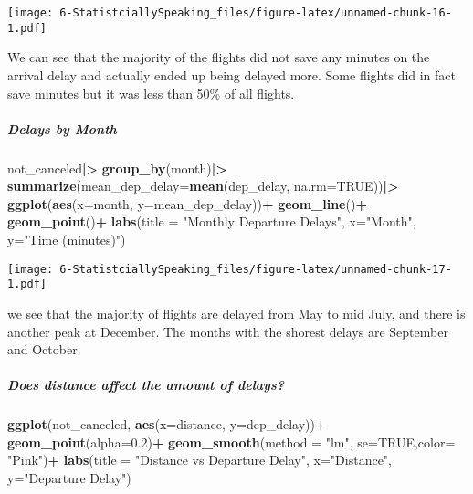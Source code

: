 \documentclass[
]{article}
\newenvironment{Shaded}{\begin{snugshade}}{\end{snugshade}}
\newcommand{\AttributeTok}[1]{\textcolor[rgb]{0.13,0.29,0.53}{#1}}
\newcommand{\ConstantTok}[1]{\textcolor[rgb]{0.56,0.35,0.01}{#1}}
\newcommand{\FloatTok}[1]{\textcolor[rgb]{0.00,0.00,0.81}{#1}}
\newcommand{\FunctionTok}[1]{\textcolor[rgb]{0.13,0.29,0.53}{\textbf{#1}}}
\newcommand{\NormalTok}[1]{#1}
\newcommand{\SpecialCharTok}[1]{\textcolor[rgb]{0.81,0.36,0.00}{\textbf{#1}}}
\newcommand{\StringTok}[1]{\textcolor[rgb]{0.31,0.60,0.02}{#1}}
\begin{document}
\texttt{[image: 6-StatistciallySpeaking\_files/figure-latex/unnamed-chunk-16-1.pdf]}

We can see that the majority of the flights did not save any minutes on
the arrival delay and actually ended up being delayed more. Some flights
did in fact save minutes but it was less than 50\% of all flights.

\subparagraph{Delays by Month}\label{delays-by-month}

\begin{Shaded}
\begin{Highlighting}[]
\NormalTok{not\_canceled}\SpecialCharTok{|\textgreater{}}
  \FunctionTok{group\_by}\NormalTok{(month)}\SpecialCharTok{|\textgreater{}}
  \FunctionTok{summarize}\NormalTok{(}\AttributeTok{mean\_dep\_delay=}\FunctionTok{mean}\NormalTok{(dep\_delay, }\AttributeTok{na.rm=}\ConstantTok{TRUE}\NormalTok{))}\SpecialCharTok{|\textgreater{}}
  \FunctionTok{ggplot}\NormalTok{(}\FunctionTok{aes}\NormalTok{(}\AttributeTok{x=}\NormalTok{month, }\AttributeTok{y=}\NormalTok{mean\_dep\_delay))}\SpecialCharTok{+}
  \FunctionTok{geom\_line}\NormalTok{()}\SpecialCharTok{+}
  \FunctionTok{geom\_point}\NormalTok{()}\SpecialCharTok{+}
  \FunctionTok{labs}\NormalTok{(}\AttributeTok{title =} \StringTok{"Monthly Departure Delays"}\NormalTok{, }\AttributeTok{x=}\StringTok{"Month"}\NormalTok{, }\AttributeTok{y=}\StringTok{"Time (minutes)"}\NormalTok{)}
\end{Highlighting}
\end{Shaded}

\texttt{[image: 6-StatistciallySpeaking\_files/figure-latex/unnamed-chunk-17-1.pdf]}

we see that the majority of flights are delayed from May to mid July,
and there is another peak at December. The months with the shorest
delays are September and October.

\subparagraph{Does distance affect the amount of
delays?}\label{does-distance-affect-the-amount-of-delays}

\begin{Shaded}
\begin{Highlighting}[]
\FunctionTok{ggplot}\NormalTok{(not\_canceled, }\FunctionTok{aes}\NormalTok{(}\AttributeTok{x=}\NormalTok{distance, }\AttributeTok{y=}\NormalTok{dep\_delay))}\SpecialCharTok{+}
  \FunctionTok{geom\_point}\NormalTok{(}\AttributeTok{alpha=}\FloatTok{0.2}\NormalTok{)}\SpecialCharTok{+}
  \FunctionTok{geom\_smooth}\NormalTok{(}\AttributeTok{method =} \StringTok{"lm"}\NormalTok{, }\AttributeTok{se=}\ConstantTok{TRUE}\NormalTok{,}\AttributeTok{color=} \StringTok{"Pink"}\NormalTok{)}\SpecialCharTok{+}
  \FunctionTok{labs}\NormalTok{(}\AttributeTok{title =} \StringTok{"Distance vs Departure Delay"}\NormalTok{, }\AttributeTok{x=}\StringTok{"Distance"}\NormalTok{, }\AttributeTok{y=}\StringTok{"Departure Delay"}\NormalTok{)}
\end{Highlighting}
\end{Shaded}
\end{document}
